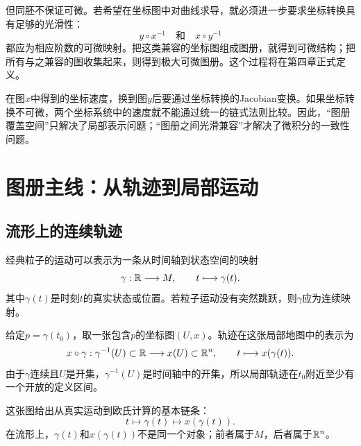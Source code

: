 但同胚不保证可微。若希望在坐标图中对曲线求导，就必须进一步要求坐标转换具有足够的光滑性：
\[
    y\circ x^{-1}
    \quad\text{和}\quad
    x\circ y^{-1}
\]
都应为相应阶数的可微映射。把这类兼容的坐标图组成图册，就得到可微结构；把所有与之兼容的图收集起来，则得到极大可微图册。这个过程将在第四章正式定义。

\begin{remark}[为什么坐标兼容性重要]
在图$x$中得到的坐标速度，换到图$y$后要通过坐标转换的Jacobian变换。如果坐标转换不可微，两个坐标系统中的速度就不能通过统一的链式法则比较。因此，“图册覆盖空间”只解决了局部表示问题；“图册之间光滑兼容”才解决了微积分的一致性问题。
\end{remark}


\section{图册主线：从轨迹到局部运动}

\subsection{流形上的连续轨迹}

经典粒子的运动可以表示为一条从时间轴到状态空间的映射
\[
    \gamma:\mathbb{R}\longrightarrow M,\qquad
    t\longmapsto\gamma(t).
\]
其中$\gamma(t)$是时刻$t$的真实状态或位置。若粒子运动没有突然跳跃，则$\gamma$应为连续映射。

给定$p=\gamma(t_0)$，取一张包含$p$的坐标图$(U,x)$。轨迹在这张局部地图中的表示为
\[
    x\circ\gamma:
    \gamma^{-1}(U)\subset\mathbb{R}
    \longrightarrow x(U)\subset\mathbb{R}^n,
    \qquad
    t\longmapsto x(\gamma(t)).
\]
由于$\gamma$连续且$U$是开集，$\gamma^{-1}(U)$是时间轴中的开集，所以局部轨迹在$t_0$附近至少有一个开放的定义区间。

\begin{center}
\end{center}

这张图给出从真实运动到欧氏计算的基本链条：
\[
    t\longmapsto\gamma(t)\longmapsto x(\gamma(t)).
\]
在流形上，$\gamma(t)$和$x(\gamma(t))$不是同一个对象；前者属于$M$，后者属于$\mathbb{R}^n$。

